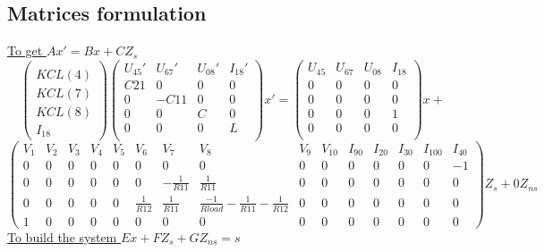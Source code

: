 \subsection{Matrices formulation}
\underline{To get $Ax'= Bx+CZ_{s}$}
\[\left(\begin{array}{c}
  \\
KCL(4)\\KCL(7)\\KCL(8)\\I_{18}
\end{array}\right)
\left(\begin{array}{cccc}
  U_{45}'&U_{67}'&U_{08}'&I_{18}'\\
  \hline
  C21&0&0&0\\
  0&-C11&0&0\\
  0&0&C&0\\
  0&0&0&L\\  
\end{array}\right)x'=
\left(\begin{array}{cccc}
  U_{45}&U_{67}&U_{08}&I_{18}\\
  \hline
  0&0&0&0\\
  0&0&0&0\\
  0&0&0&1\\
  0&0&0&0\\
\end{array}\right)x+\]
\[
\left(\begin{array}{ccccccccccccccc}
  V_{1}&V_{2}&V_{3}&V_{4}&V_{5}&V_{6}&V_{7}&V_{8}&V_{9}&V_{10}&I_{90}&I_{20}&I_{30}&I_{100}&I_{40}\\
  \hline
  0&0&0&0&0&0&0&0&0&0&0&0&0&0&-1\\
  0&0&0&0&0&0&-\frac{1}{R11}&\frac{1}{R11}&0&0&0&0&0&0&0\\
  0&0&0&0&0&\frac{1}{R12}&\frac{1}{R11}&\frac{-1}{Rload}-\frac{1}{R11}-\frac{1}{R12}&0&0&0&0&0&0&0\\
  1&0&0&0&0&0&0&0&0&0&0&0&0&0&0
\end{array}\right)Z_{s}+0Z_{ns}\]
\underline{To build the system $Ex+FZ_{s}+GZ_{ns}=s$}
